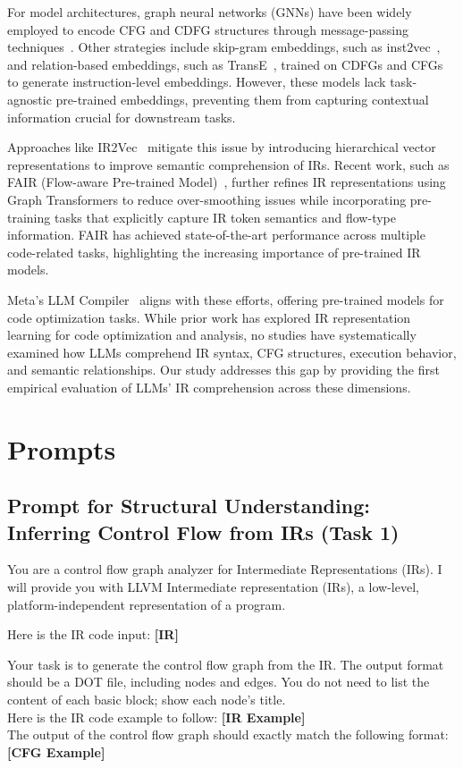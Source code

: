 For model architectures, graph neural networks (GNNs) have been widely employed to encode CFG and CDFG structures through message-passing techniques~\cite{brauckmann2020compiler, cummins2021programl, yu2020codecmr}. Other strategies include skip-gram embeddings, such as inst2vec~\cite{ben2018neural}, and relation-based embeddings, such as TransE~\cite{bordes2013transE}, trained on CDFGs and CFGs to generate instruction-level embeddings. However, these models lack task-agnostic pre-trained embeddings, preventing them from capturing contextual information crucial for downstream tasks. 

Approaches like IR2Vec~\cite{2020ir2vec} mitigate this issue by introducing hierarchical vector representations to improve semantic comprehension of IRs. Recent work, such as FAIR (Flow-aware Pre-trained Model)~\cite{niu2024fair}, further refines IR representations using Graph Transformers to reduce over-smoothing issues while incorporating pre-training tasks that explicitly capture IR token semantics and flow-type information. FAIR has achieved state-of-the-art performance across multiple code-related tasks, highlighting the increasing importance of pre-trained IR models.

Meta's LLM Compiler~\cite{llmscompiler} aligns with these efforts, offering pre-trained models for code optimization tasks. While prior work has explored IR representation learning for code optimization and analysis, no studies have systematically examined how LLMs comprehend IR syntax, CFG structures, execution behavior, and semantic relationships. Our study addresses this gap by providing the first empirical evaluation of LLMs' IR comprehension across these dimensions.



\section{Prompts}
\subsection{Prompt for Structural Understanding: Inferring Control Flow
from IRs (Task 1)}
\begin{prompt}
You are a control flow graph analyzer for Intermediate Representations (IRs). I will provide you with LLVM Intermediate representation (IRs), a low-level, platform-independent representation of a program.

Here is the IR code input:  
    \textbf{[IR]}
    
Your task is to generate the control flow graph from the IR. The output format should be a DOT file, including nodes and edges. You do not need to list the content of each basic block; show each node's title. \\
Here is the IR code example to follow:
     \textbf{[IR Example]}\\
The output of the control flow graph should exactly match the following format:
    \textbf{[CFG Example]}
\end{prompt}
